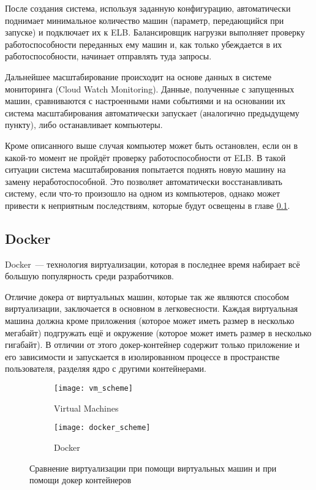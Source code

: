 	После создания система, используя заданную конфигурацию, автоматически поднимает минимальное количество машин (параметр, передающийся при запуске) и подключает их к ELB. Балансировщик нагрузки выполняет проверку работоспособности переданных ему машин и, как только убеждается в их работоспособности, начинает отправлять туда запросы.
	
	Дальнейшее масштабирование происходит на основе данных в системе мониторинга (Cloud Watch Monitoring). Данные, полученные с запущенных машин, сравниваются с настроенными нами событиями и на основании их система масштабирования автоматически  запускает (аналогично предыдущему пункту), либо останавливает компьютеры.
	
	Кроме описанного выше случая компьютер может быть остановлен, если он в какой-то момент не пройдёт проверку работоспособности от ELB. В такой ситуации система масштабирования попытается поднять новую машину на замену неработоспособной. Это позволяет автоматически восстанавливать систему, если что-то произошло на одном из компьютеров, однако может привести к неприятным последствиям, которые будут освещены в главе \ref{}.

\subsection{Docker}

	Docker~--- технология виртуализации, которая в последнее время набирает всё большую популярность среди разработчиков. 
	
	Отличие докера от виртуальных машин, которые так же являются способом виртуализации, заключается в основном в легковесности. Каждая виртуальная машина должна кроме приложения (которое может иметь размер в несколько мегабайт) подгружать ещё и окружение (которое может иметь размер в несколько гигабайт). В отличии от этого докер-контейнер содержит только приложение и его зависимости и запускается в изолированном процессе в пространстве пользователя, разделяя ядро с другими контейнерами.
\begin{figure}[h]
	\centering
	\begin{subfigure}[b]{.5\textwidth}
  		\texttt{[image: vm\_scheme]}
  		\caption{Virtual Machines}
  		\label{fig:sub1}
	\end{subfigure}%
	\begin{subfigure}[b]{.5\textwidth}
  		\texttt{[image: docker\_scheme]}
  		\caption{Docker}
  		\label{fig:sub2}
	\end{subfigure}
	\caption{Сравнение виртуализации при помощи виртуальных машин и при помощи докер контейнеров}
	\label{fig:test}
\end{figure}

